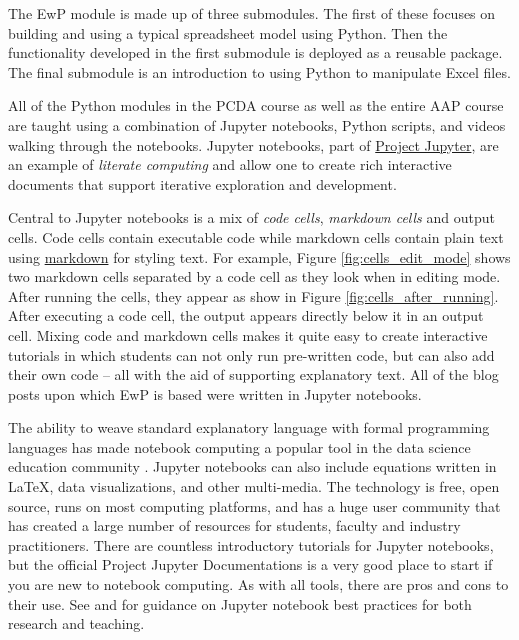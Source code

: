 \documentclass[ited,blindrev]{informs3}              %
\begin{document}
The EwP module is made up of three submodules. The first of these focuses on building and using a typical spreadsheet model using Python. Then the functionality developed in the first submodule is deployed as a reusable package. The final submodule is an introduction to using Python to manipulate Excel files.

All of the Python modules in the PCDA course as well as the entire AAP course are taught using a combination of Jupyter notebooks, Python scripts, and videos walking through the notebooks. Jupyter notebooks, part of \href{https://jupyter.org/}{Project Jupyter}, are an example of \textit{literate computing} \cite{perez2015project} and allow one to create rich interactive documents that support iterative exploration and development. 

Central to Jupyter notebooks is a mix of \textit{code cells}, \textit{markdown cells} and output cells. Code cells contain executable code while markdown cells contain plain text using \href{URL}{markdown} for styling text. For example, Figure \ref{fig:cells_edit_mode} shows two markdown cells separated by a code cell as they look when in editing mode. After running the cells, they appear as show in Figure \ref{fig:cells_after_running}. After executing a code cell, the output appears directly below it in an output cell. Mixing code and markdown cells makes it quite easy to create interactive tutorials in which students can not only run pre-written code, but can also add their own code -- all with the aid of supporting explanatory text. All of the blog posts upon which EwP is based were written in Jupyter notebooks. 

The ability to weave standard explanatory language with formal programming languages has made notebook computing a popular tool in the data science education community \cite{perkel2018jupyter}. Jupyter notebooks can also include equations written in \LaTeX, data visualizations, and other multi-media. The technology is free, open source, runs on most computing platforms, and has a huge user community that has created a large number of resources for students, faculty and industry practitioners. There are countless introductory tutorials for Jupyter notebooks, but the official Project Jupyter Documentations \cite{jupyterteamProjectJupyterDocumentation2015} is a very good place to start if you are new to notebook computing. As with all tools, there are pros and cons to their use. See \cite{rule2018ten, barba2019teaching} and \cite{johnson2020benefits} for guidance on Jupyter notebook best practices for both research and teaching.
\end{document}
